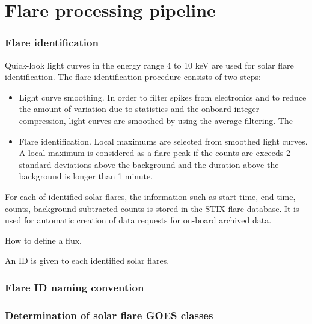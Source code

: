 \documentclass{aa}
\begin{document}
\section{Flare processing pipeline}

\subsubsection{Flare identification}
Quick-look light curves in the energy range 4 to 10 keV are used for solar flare identification.  The flare identification procedure consists of  two steps:
\begin{itemize}
\item Light curve smoothing. In order to filter spikes from electronics and to reduce the amount of variation due to statistics and the onboard integer compression, light curves are smoothed by using the average filtering. The
\item Flare identification. Local maximums are selected from smoothed light curves.  A local maximum is considered as a flare peak if the counts are exceeds 2 standard deviations above the background and the duration above the background is longer than 1 minute.
\end{itemize}

For each of identified solar flares,   the  information such as start time, end time, counts, background subtracted counts is stored in the STIX flare database.   It is used for automatic creation of data requests for on-board archived data.

How to define a flux.

An ID is given to each identified solar flares. 

\subsubsection{Flare ID naming convention}
\subsubsection{Determination of solar flare GOES classes}
\end{document}
